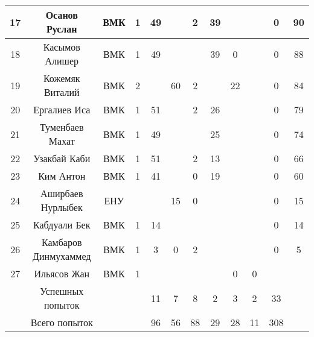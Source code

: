 \documentclass[10pt, a4paper, landscape]{article}
\begin{document}
\begin{center}
\begin{longtable}{|c|c|c|c|*{6}{c|}c|c|}
 \hline
17 & 	Осанов Руслан & 	ВМК & 1 & 	49 & 	  & 	2 & 	39 & 	  & 	  & 	0 & 	90 \\ 
 \hline
18 & 	Касымов Алишер & 	ВМК & 1 & 	49 & 	  & 	  & 	39 & 	0 & 	  & 	0 & 	88 \\ 
 \hline
19 & 	Кожемяк Виталий & 	ВМК & 2 & 	  & 	60 & 	2 & 	  & 	22 & 	  & 	0 & 	84 \\ 
 \hline
20 & 	Ергалиев Иса & 	ВМК &  1 &	51 & 	  & 	2 & 	26 & 	  & 	  & 	0 & 	79 \\ 
 \hline
21 & 	Туменбаев Махат & 	ВМК & 1 & 	49 & 	  & 	  & 	25 & 	  & 	  & 	0 & 	74 \\ 
 \hline
22 & 	Узакбай Каби & 	ВМК & 1 & 	51 & 	  & 	2 & 	13 & 	  & 	  & 	0 & 	66 \\ 
 \hline
23 & 	Ким Антон & 	ВМК & 1 & 	41 & 	  & 	0 & 	19 & 	  & 	  & 	0 & 	60 \\ 
 \hline
24 & 	Аширбаев Нурлыбек & ЕНУ  & 	 & 	  & 	15 & 	0 & 	  & 	  & 	  & 	0 & 	15 \\ 
 \hline
25 & 	Кабдуали Бек & 	ВМК & 1 & 	14 & 	  & 	  & 	  & 	  & 	  & 	0 & 	14 \\ 
 \hline
26 & 	Камбаров Динмухаммед & 	ВМК & 1 & 	3 & 	0 & 	2 & 	  & 	  & 	  & 	0 & 	5 \\ 
 \hline
27 & 	Ильясов Жан & 	ВМК & 1 & 	  & 	  & 	  & 	  & 	0 & 	0 & 	 & 	 \\ 
 \hline
 & 	Успешных попыток & 	&	& 11 & 	7 & 	8 & 	2 & 	3 & 	2 & 	33 & 	 \\ 
 \hline
 & 	Всего попыток & 	&	& 96 & 	56 & 	88 & 	29 & 	28 & 	11 & 	308 & 	 \\ 
 \hline
\end{longtable}
\end{center}

\renewcommand{\arraystretch}{1}
\end{document}
